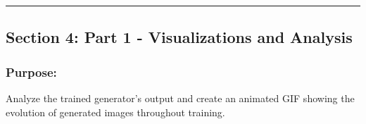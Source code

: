 \documentclass[11pt]{article}
\begin{document}
    \begin{center}\rule{0.5\linewidth}{0.5pt}\end{center}

\subsection{Section 4: Part 1 - Visualizations and
Analysis}\label{section-4-part-1---visualizations-and-analysis}

\subsubsection{Purpose:}\label{purpose}

Analyze the trained generator's output and create an animated GIF
showing the evolution of generated images throughout training.
\end{document}
